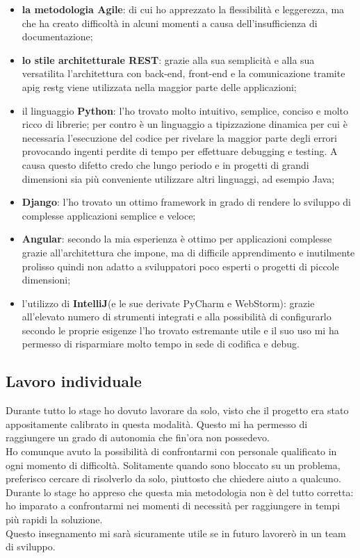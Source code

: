 		\begin{itemize}
			\item \textbf{la metodologia Agile}: di cui ho apprezzato la flessibilità e leggerezza, ma che ha creato difficoltà in alcuni momenti a causa dell'insufficienza di documentazione;
			\item \textbf{lo stile architetturale REST}: grazie alla sua semplicità e alla sua versatilita l'architettura con back-end, front-end e la comunicazione tramite \gls{apig} \gls{restg} viene utilizzata nella maggior parte delle applicazioni;
			\item il linguaggio \textbf{Python}: l'ho trovato molto intuitivo, semplice, conciso e molto ricco di librerie; per contro è un linguaggio a tipizzazione dinamica per cui è necessaria l'esecuzione del codice per rivelare la maggior parte degli errori provocando ingenti perdite di tempo per effettuare debugging e testing. A causa questo difetto credo che lungo periodo e in progetti di grandi dimensioni sia più conveniente utilizzare altri linguaggi, ad esempio Java;
			\item \textbf{Django}: l'ho trovato un ottimo framework in grado di rendere lo sviluppo di complesse applicazioni semplice e veloce;
			\item \textbf{Angular}: secondo la mia esperienza è ottimo per applicazioni complesse grazie all'architettura che impone, ma di difficile apprendimento e inutilmente prolisso quindi non adatto a sviluppatori poco esperti o progetti di piccole dimensioni;
			\item l'utilizzo di \textbf{IntelliJ}(e le sue derivate PyCharm e WebStorm): grazie all'elevato numero di strumenti integrati e alla possibilità di configurarlo secondo le proprie esigenze l'ho trovato estremante utile e il suo uso mi ha permesso di risparmiare molto tempo in sede di codifica e debug.
		\end{itemize}
			
	\label{sub:lavoro}
	\subsection{Lavoro individuale}
	Durante tutto lo stage ho dovuto lavorare da solo, visto che il progetto era stato appositamente calibrato in questa modalità. Questo mi ha permesso di raggiungere un grado di autonomia che fin’ora non possedevo.\\
	Ho comunque avuto la possibilità di confrontarmi con personale qualificato in ogni
	momento di difficoltà. Solitamente quando sono bloccato su un problema, preferisco
	cercare di risolverlo da solo, piuttosto che chiedere aiuto a qualcuno. Durante lo stage
	ho appreso che questa mia metodologia non è del tutto corretta: ho imparato a confrontarmi nei momenti di necessità per raggiungere in tempi più rapidi la soluzione.\\
	Questo insegnamento mi sarà sicuramente utile se in futuro lavorerò in un team di
	sviluppo.

